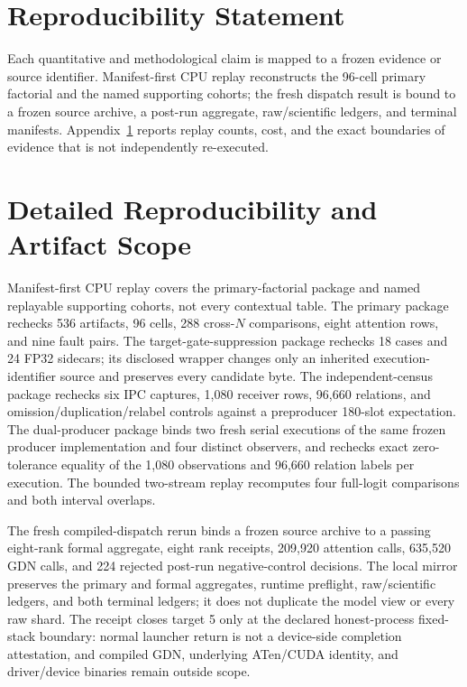 \documentclass{article}
\begin{document}
\section*{Reproducibility Statement}
Each quantitative and methodological claim is mapped to a frozen evidence or
source identifier.  Manifest-first CPU replay reconstructs the 96-cell primary
factorial and the named supporting cohorts; the fresh dispatch result is bound
to a frozen source archive, a post-run aggregate, raw/scientific ledgers, and
terminal manifests.  Appendix~\ref{app:reproducibility} reports replay counts,
cost, and the exact boundaries of evidence that is not independently
re-executed.




\appendix

\section{Detailed Reproducibility and Artifact Scope}
\label{app:reproducibility}

Manifest-first CPU replay covers the primary-factorial package and named
replayable supporting cohorts, not every contextual table.  The primary package
rechecks 536 artifacts, 96 cells, 288 cross-$N$ comparisons, eight attention
rows, and nine fault pairs.  The target-gate-suppression package rechecks 18
cases and 24 FP32 sidecars; its disclosed wrapper changes only an inherited
execution-identifier source and preserves every candidate byte.  The
independent-census package rechecks six IPC captures, 1,080 receiver rows,
96,660 relations, and omission/duplication/relabel controls against a
preproducer 180-slot expectation.  The dual-producer package binds two fresh
serial executions of the same frozen producer implementation and four distinct
observers, and rechecks exact zero-tolerance equality of the 1,080 observations
and 96,660 relation labels per execution.  The
bounded two-stream replay recomputes four full-logit comparisons and both
interval overlaps.

The fresh compiled-dispatch rerun binds a frozen source archive to a passing
eight-rank formal aggregate, eight rank receipts, 209,920 attention calls,
635,520 GDN calls, and 224 rejected post-run negative-control decisions.  The
local mirror preserves the primary and formal aggregates, runtime preflight,
raw/scientific ledgers, and both terminal ledgers; it does not duplicate the
model view or every raw shard.  The receipt closes target 5 only at the
declared honest-process fixed-stack boundary: normal launcher return is not a
device-side completion attestation, and compiled GDN, underlying ATen/CUDA
identity, and driver/device binaries remain outside scope.
\end{document}
